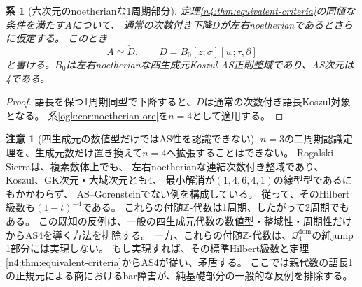 \documentclass[11pt,a4paper]{ltjsarticle}
\newtheorem{corollary}[theorem]{系}
\theoremstyle{definition}
\newtheorem{remark}[theorem]{注意}
\begin{document}
\begin{corollary}[六次元のnoetherianな1周期部分]
\label{n4:cor:noetherian-periodic-ore}
定理\ref{n4:thm:equivalent-criteria}の同値な条件を満たす$A$について、
通常の次数付き下降$D$が左右noetherianであるとさらに仮定する。
このとき
\[
A\simeq\check D,\qquad D=B_0[z;\sigma][w;\tau,\partial]
\]
と書ける。$B_0$は左右noetherianな四生成元Koszul AS正則整域であり、AS次元は4である。
\end{corollary}
\begin{proof}
語長を保つ1周期同型で下降すると、$D$は通常の次数付き語長Koszul対象となる。
系\ref{ogk:cor:noetherian-ore}を$n=4$として適用する。
\end{proof}

\begin{remark}[四生成元の数値型だけではAS性を認識できない]
$n=3$の二周期認識定理を、生成元数だけ置き換えて$n=4$へ拡張することはできない。
Rogalski--Sierra\cite[Theorem 1.1, (1.2)]{RSsurface}は、複素数体上でも、
左右noetherianな連結次数付き整域であり、Koszul、GK次元・大域次元とも4、
最小解消が$(1,4,6,4,1)$の線型型であるにもかかわらず、
AS--Gorensteinでない例を構成している。
従って、そのHilbert級数も$(1-t)^{-4}$である。
これらの付随$\mathbb Z$-代数は1周期、したがって2周期でもある。
この既知の反例は、一般の四生成元代数の数値型・整域性・周期性だけからAS4を導く方法を排除する。
一方、これらの付随$\mathbb Z$-代数は、$\mathcal Q_4^{\mathrm{dom}}$の純jump 1部分には実現しない。
もし実現すれば、その標準Hilbert級数と定理\ref{n4:thm:equivalent-criteria}からAS4が従い、矛盾する。
ここでは親代数の語長1の正規元による商におけるbar障害が、純基礎部分の一般的な反例を排除する。
\end{remark}
\end{document}
